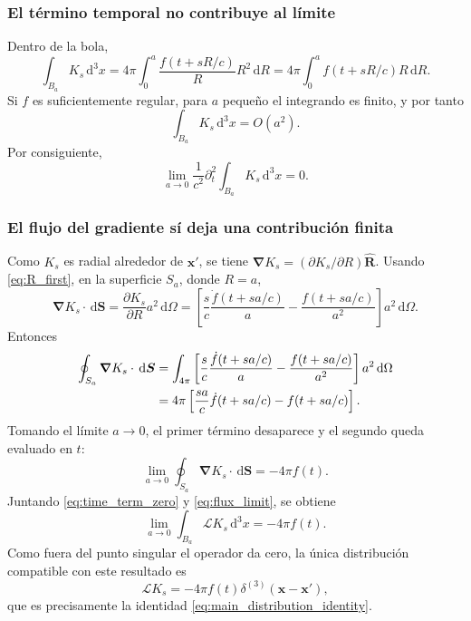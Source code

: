 \documentclass{article}
\numberwithin{equation}{section}
\newcommand{\dd}{\,\mathrm{d}}
\newcommand{\grad}{\bm{\nabla}}
\newcommand{\x}{\bm{x}}
\newcommand{\xp}{\bm{x}'}
\newcommand{\R}{R}
\newcommand{\Boxop}{\mathcal{L}}
\newcommand{\hR}{\hat{\bm{R}}}
\begin{document}
\subsubsection{El término temporal no contribuye al límite}

Dentro de la bola,
\begin{equation}
    \int_{B_a}K_s\dd^3x
    =4\pi\int_0^a \frac{f(t+s\R/c)}{\R}\R^2\dd\R
    =4\pi\int_0^a f(t+s\R/c)\R\dd\R.
    \label{eq:small_ball_time}
\end{equation}
Si \(f\) es suficientemente regular, para \(a\) pequeño el integrando es finito, y por tanto
\begin{equation}
    \int_{B_a}K_s\dd^3x=O(a^2).
    \label{eq:small_ball_order}
\end{equation}
Por consiguiente,
\begin{equation}
    \lim_{a\to 0}\frac{1}{c^2}\partial_t^2\int_{B_a}K_s\dd^3x=0.
    \label{eq:time_term_zero}
\end{equation}

\subsubsection{El flujo del gradiente sí deja una contribución finita}

Como \(K_s\) es radial alrededor de \(\xp\), se tiene \(\grad K_s=(\partial K_s/\partial\R)\hR\). Usando \eqref{eq:R_first}, en la superficie \(S_a\), donde \(\R=a\),
\begin{equation}
    \grad K_s\cdot\dd\bm{S}
    =\frac{\partial K_s}{\partial\R}a^2\dd\Omega
    =\left[\frac{s}{c}\frac{\dot f(t+sa/c)}{a}-\frac{f(t+sa/c)}{a^2}\right]a^2\dd\Omega.
    \label{eq:flux_density}
\end{equation}
Entonces
\begin{align}
    \oint_{S_a}\grad K_s\cdot\dd\bm{S}
    &=\int_{4\pi}\left[\frac{s}{c}\frac{\dot f(t+sa/c)}{a}-\frac{f(t+sa/c)}{a^2}\right]a^2\dd\Omega \notag\\
    &=4\pi\left[\frac{s a}{c}\dot f(t+sa/c)-f(t+sa/c)\right].
    \label{eq:flux_result}
\end{align}
Tomando el límite \(a\to 0\), el primer término desaparece y el segundo queda evaluado en \(t\):
\begin{equation}
    \lim_{a\to 0}\oint_{S_a}\grad K_s\cdot\dd\bm{S}
    =-4\pi f(t).
    \label{eq:flux_limit}
\end{equation}
Juntando \eqref{eq:time_term_zero} y \eqref{eq:flux_limit}, se obtiene
\begin{equation}
    \lim_{a\to 0}\int_{B_a}\Boxop K_s\dd^3x=-4\pi f(t).
    \label{eq:small_ball_result}
\end{equation}
Como fuera del punto singular el operador da cero, la única distribución compatible con este resultado es
\begin{equation}
    \Boxop K_s=-4\pi f(t)\delta^{(3)}(\x-\xp),
    \label{eq:kernel_distribution_final}
\end{equation}
que es precisamente la identidad \eqref{eq:main_distribution_identity}.
\end{document}
